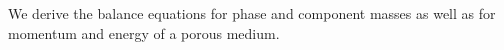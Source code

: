 
We derive the balance equations for phase and component masses as well as for momentum and energy of a porous medium.



